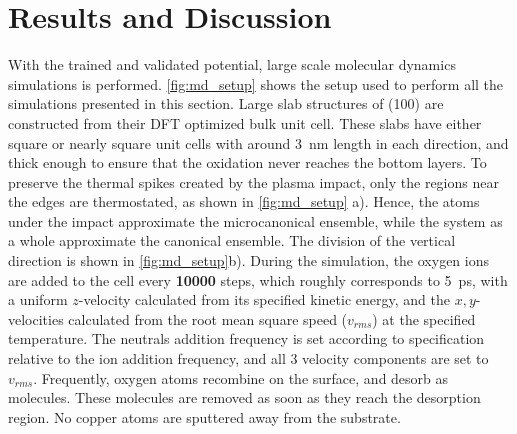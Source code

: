 \documentclass[manuscript=cmatex]{achemso}
\begin{document}
\section{Results and Discussion}
With the trained and validated potential, large scale molecular dynamics simulations is performed. \cref{fig:md_setup} shows the setup used to perform all the simulations presented in this section. Large slab structures of (100) are constructed from their DFT optimized bulk unit cell. These slabs have either square or nearly square unit cells with around \SI{3}{nm} length in each direction, and thick enough to ensure that the oxidation never reaches the bottom layers. To preserve the thermal spikes created by the plasma impact, only the regions near the edges are thermostated, as shown in \cref{fig:md_setup} a). Hence, the atoms under the impact approximate the microcanonical ensemble, while the system as a whole approximate the canonical ensemble. The division of the vertical direction is shown in \cref{fig:md_setup}b). During the simulation, the oxygen ions are added to the cell every \textbf{10000} steps, which roughly corresponds to \SI{5}{ps}, with a uniform $z$-velocity calculated from its specified kinetic energy, and the $x,y$-velocities calculated from the root mean square speed ($v_{rms}$) at the specified temperature. The neutrals addition frequency is set according to specification relative to the ion addition frequency, and all 3 velocity components are set to $v_{rms}$. Frequently, oxygen atoms recombine on the surface, and desorb as  molecules. These molecules are removed as soon as they reach the desorption region. No copper atoms are sputtered away from the substrate. 
\end{document}

